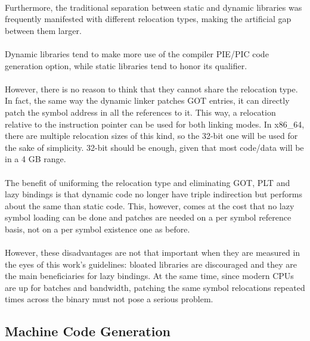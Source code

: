 \documentclass[12pt]{article}
\begin{document}
	\paragraph{}Furthermore, the traditional separation between static and dynamic libraries was frequently manifested with different relocation types, making the artificial gap between them larger.
	\paragraph{}Dynamic libraries tend to make more use of the compiler \acrshort{PIE}/\acrshort{PIC} code generation option, while static libraries tend to honor its qualifier.
	\paragraph{}However, there is no reason to think that they cannot share the relocation type. In fact, the same way the dynamic linker patches \acrshort{GOT} entries, it can directly patch the symbol address in all the references to it. This way, a relocation relative to the instruction pointer can be used for both linking modes. In x86\_64, there are multiple relocation sizes of this kind, so the 32-bit one will be used for the sake of simplicity. 32-bit should be enough, given that most code/data will be in a 4 GB range.
	\paragraph{}The benefit of uniforming the relocation type and eliminating \acrshort{GOT}, \acrshort{PLT} and lazy bindings is that dynamic code no longer have triple indirection but performs about the same than static code. This, however, comes at the cost that no lazy symbol loading can be done and patches are needed on a per symbol reference basis, not on a per symbol existence one as before.
	\paragraph{}However, these disadvantages are not that important when they are measured in the eyes of this work's guidelines: bloated libraries are discouraged and they are the main beneficiaries for lazy bindings. At the same time, since modern CPUs are up for batches and bandwidth, patching the same symbol relocations repeated times across the binary must not pose a serious problem.

	\subsection{Machine Code Generation}
	
\end{document}
